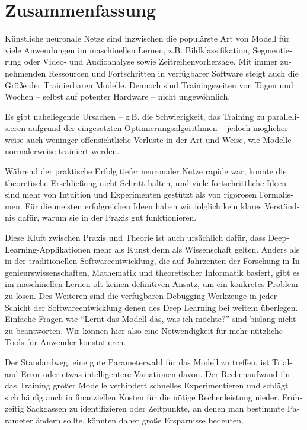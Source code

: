 \chapter*{Zusammenfassung}

\begin{otherlanguage}{german}

    Künstliche neuronale Netze sind inzwischen die populärste Art von Modell für
    viele Anwendungen im maschinellen Lernen, z.B. Bildklassifikation,
    Segmentierung oder Video- und Audioanalyse sowie Zeitreihenvorhersage.  Mit
    immer zunehmenden Ressourcen und Fortschritten in verfügbarer Software
    steigt auch die Größe der Trainierbaren Modelle. Dennoch sind
    Trainingszeiten von Tagen und Wochen -- selbst auf potenter Hardware --
    nicht ungewöhnlich.

    Es gibt naheliegende Ursachen -- z.B. die Schwierigkeit, das Training zu
    parallelisieren aufgrund der eingesetzten Optimierungsalgorithmen -- jedoch
    möglicherweise auch weninger offensichtliche Verluste in der Art und Weise,
    wie Modelle normalerweise trainiert werden.

    Während der praktische Erfolg tiefer neuronaler Netze rapide war, konnte die
    theoretische Erschließung nicht Schritt halten, und viele fortschrittliche
    Ideen sind mehr von Intuition und Experimenten gestützt als von rigorosen
    Formalismen.  Für die meisten erfolgreichen Ideen haben wir folglich kein
    klares Verständnis dafür, warum sie in der Praxis gut funktionieren.

    Diese Kluft zwischen Praxis und Theorie ist auch ursächlich dafür, dass
    Deep-Learning-Applikationen mehr als Kunst denn als Wissenschaft gelten.
    Anders als in der traditionellen Softwareentwicklung, die auf Jahrzenten der
    Forschung in Ingenieurswissenschaften, Mathematik und theoretischer
    Informatik basiert, gibt es im maschinellen Lernen oft keinen definitiven
    Ansatz, um ein konkretes Problem zu lösen. Des Weiteren sind die verfügbaren
    Debugging-Werkzeuge in jeder Schicht der Softwareentwicklung denen des Deep
    Learning bei weitem überlegen. Einfache Fragen wie ``Lernt das Modell das,
    was ich möchte?'' sind bislang nicht zu beantworten. Wir können hier also
    eine Notwendigkeit für mehr nützliche Tools für Anwender konstatieren.

    Der Standardweg, eine gute Parameterwahl für das Modell zu treffen, ist
    Trial-and-Error oder etwas intelligentere Variationen davon. Der
    Rechenaufwand für das Training großer Modelle verhindert schnelles
    Experimentieren und schlägt sich häufig auch in finanziellen Kosten für die
    nötige Rechenleistung nieder.  Frühzeitig Sackgassen zu identifizieren oder
    Zeitpunkte, an denen man bestimmte Parameter ändern sollte, könnten daher
    große Ersparnisse bedeuten.


\end{otherlanguage}
